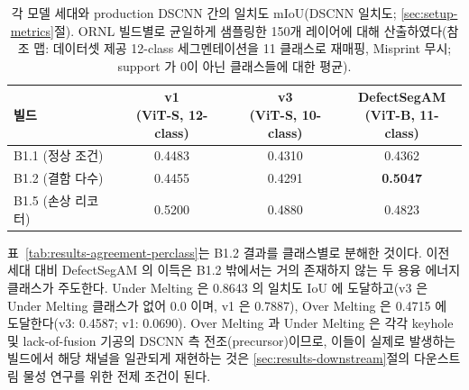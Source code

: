 \begin{table}[t]
\centering
\caption{각 모델 세대와 production DSCNN 간의 일치도 mIoU(DSCNN 일치도;
\ref{sec:setup-metrics}절). ORNL 빌드별로 균일하게 샘플링한 150개
레이어에 대해 산출하였다(참조 맵: 데이터셋 제공 12-class 세그멘테이션을
11 클래스로 재매핑, Misprint 무시; support 가 0이 아닌 클래스들에 대한
평균).}
\label{tab:results-agreement-miou}
\footnotesize
\begin{tabular}{lccc}
\toprule
빌드 & \makecell{v1\\(ViT-S, 12-class)} & \makecell{v3\\(ViT-S, 10-class)} & \makecell{DefectSegAM\\(ViT-B, 11-class)} \\
\midrule
B1.1 (정상 조건)        & 0.4483 & 0.4310 & 0.4362 \\
B1.2 (결함 다수)        & 0.4455 & 0.4291 & \textbf{0.5047} \\
B1.5 (손상 리코터)      & 0.5200 & 0.4880 & 0.4823 \\
\bottomrule
\end{tabular}
\end{table}

표~\ref{tab:results-agreement-perclass}는 B1.2 결과를 클래스별로 분해한
것이다. 이전 세대 대비 DefectSegAM 의 이득은 B1.2 밖에서는 거의 존재하지
않는 두 용융 에너지 클래스가 주도한다. Under Melting 은 0.8643 의 일치도
IoU 에 도달하고(v3 은 Under Melting 클래스가 없어 0.0 이며, v1 은 0.7887),
Over Melting 은 0.4715 에 도달한다(v3: 0.4587; v1: 0.0690). Over Melting
과 Under Melting 은 각각 keyhole 및 lack-of-fusion 기공의 DSCNN 측
전조(precursor)이므로, 이들이 실제로 발생하는 빌드에서 해당 채널을
일관되게 재현하는 것은 \ref{sec:results-downstream}절의 다운스트림 물성
연구를 위한 전제 조건이 된다.

